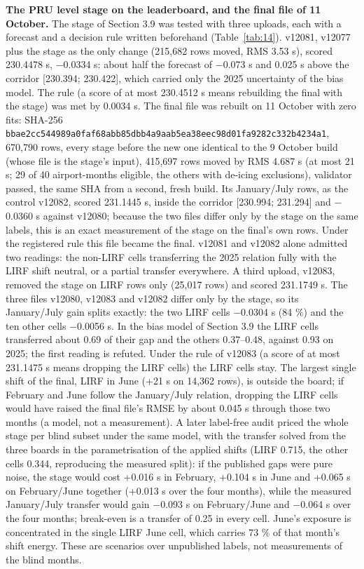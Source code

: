 \documentclass[
  manuscript=article,  %
  layout=preprint,     %
  year=2026,
  volume=4,
]{extra/joas}
\begin{document}
\textbf{The PRU level stage on the leaderboard, and the final file of 11 October.} The stage of Section 3.9 was tested with three uploads, each with a forecast and a decision rule written beforehand (Table~\ref{tab:14}). v12081, v12077 plus the stage as the only change (215,682 rows moved, RMS 3.53 s), scored 230.4478 s, $-$0.0334 s: about half the forecast of $-$0.073 s and 0.025 s above the corridor {[}230.394; 230.422{]}, which carried only the 2025 uncertainty of the bias model. The rule (a score of at most 230.4512 s means rebuilding the final with the stage) was met by 0.0034 s. The final file was rebuilt on 11 October with zero fits: SHA-256 \texttt{bbae2cc544989a0faf68abb85dbb4a9aab5ea38eec98d01fa9282c332b4234a1}, 670,790 rows, every stage before the new one identical to the 9 October build (whose file is the stage's input), 415,697 rows moved by RMS 4.687 s (at most 21 s; 29 of 40 airport-months eligible, the others with de-icing exclusions), validator passed, the same SHA from a second, fresh build. Its January/July rows, as the control v12082, scored 231.1445 s, inside the corridor {[}230.994; 231.294{]} and $-$0.0360 s against v12080; because the two files differ only by the stage on the same labels, this is an exact measurement of the stage on the final's own rows. Under the registered rule this file became the final. v12081 and v12082 alone admitted two readings: the non-LIRF cells transferring the 2025 relation fully with the LIRF shift neutral, or a partial transfer everywhere. A third upload, v12083, removed the stage on LIRF rows only (25,017 rows) and scored 231.1749 s. The three files v12080, v12083 and v12082 differ only by the stage, so its January/July gain splits exactly: the two LIRF cells $-$0.0304 s (84 \%) and the ten other cells $-$0.0056 s. In the bias model of Section 3.9 the LIRF cells transferred about 0.69 of their gap and the others 0.37--0.48, against 0.93 on 2025; the first reading is refuted. Under the rule of v12083 (a score of at most 231.1475 s means dropping the LIRF cells) the LIRF cells stay. The largest single shift of the final, LIRF in June (+21 s on 14,362 rows), is outside the board; if February and June follow the January/July relation, dropping the LIRF cells would have raised the final file's RMSE by about 0.045 s through those two months (a model, not a measurement). A later label-free audit priced the whole stage per blind subset under the same model, with the transfer solved from the three boards in the parametrisation of the applied shifts (LIRF 0.715, the other cells 0.344, reproducing the measured split): if the published gaps were pure noise, the stage would cost +0.016 s in February, +0.104 s in June and +0.065 s on February/June together (+0.013 s over the four months), while the measured January/July transfer would gain $-$0.093 s on February/June and $-$0.064 s over the four months; break-even is a transfer of 0.25 in every cell. June's exposure is concentrated in the single LIRF June cell, which carries 73 \% of that month's shift energy. These are scenarios over unpublished labels, not measurements of the blind months.
\end{document}
